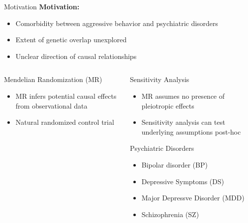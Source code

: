 \documentclass{beamer}
\begin{document}
\begin{frame}[t]{Motivation}
  \tiny
  \textbf{Motivation:}
  \begin{itemize}
    \item Comorbidity between aggressive behavior and psychiatric disorders 
    \item Extent of genetic overlap unexplored
    \item Unclear direction of causal relationships
  \end{itemize}
  \begin{columns}[T]
    \begin{column}[T]{0.5\textwidth}
      \begin{block}{\tiny Mendelian Randomization (MR)}
        \tiny
        \begin{itemize}
          \item MR infers potential causal effects from observational data 
          \item Natural randomized control trial
        \end{itemize}
        \begin{center}
          \resizebox{0.8\textwidth}{!}{}
        \end{center}
     \end{block} 
    \end{column}
    \begin{column}[T]{0.5\textwidth}
      \begin{block}{\tiny Sensitivity Analysis}
        \begin{itemize}
          \tiny
          \item MR assumes no presence of pleiotropic effects
          \item Sensitivity analysis can test underlying assumptions post-hoc
        \end{itemize}
      \end{block}
      \begin{block}{\tiny Psychiatric Disorders}
        \tiny
        \begin{itemize}
          \item Bipolar disorder (BP) 
          \item Depressive Symptoms (DS) 
          \item Major Depressve Disorder (MDD) 
          \item Schizophrenia (SZ) 
        \end{itemize}
    \end{block}
    \end{column}
  \end{columns}
\end{frame}
\end{document}
